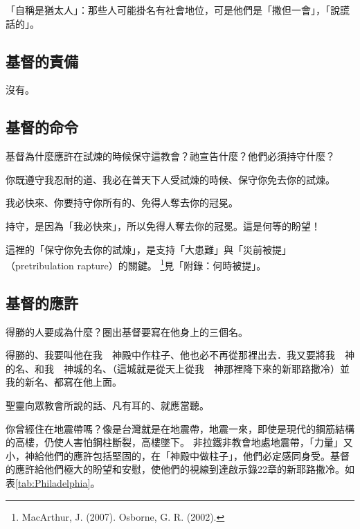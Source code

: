 「自稱是猶太人」：那些人可能掛名有社會地位，可是他們是「撒但一會」，「說謊話的」。
 
\subsection{基督的責備}

沒有。

\subsection{基督的命令}

\begin{ScriptureBox2}{基督為什麼應許在試煉的時候保守這教會？祂宣告什麼？他們必須持守什麼？}

\item[3:10] 你既遵守我忍耐的道、我必在普天下人受試煉的時候、保守你免去你的試煉。

\item[3:11] 我必快來、你要持守你所有的、免得人奪去你的冠冕。

\end{ScriptureBox2}

持守，是因為「我必快來」，所以免得人奪去你的冠冕。這是何等的盼望！

這裡的「保守你免去你的試煉」，是支持「大患難」與「災前被提」（pretribulation rapture）的關鍵。
\footnote{MacArthur, J. (2007). Osborne, G. R. (2002).}見「附錄：何時被提」。

\subsection{基督的應許}

\begin{ScriptureBox2}{得勝的人要成為什麼？圈出基督要寫在他身上的三個名。}

\item[3:12] 得勝的、我要叫他在我　神殿中作柱子、他也必不再從那裡出去．我又要將我　神的名、和我　神城的名、（這城就是從天上從我　神那裡降下來的新耶路撒冷）並我的新名、都寫在他上面。

\item[3:13] 聖靈向眾教會所說的話、凡有耳的、就應當聽。

\end{ScriptureBox2}

你曾經住在地震帶嗎？像是台灣就是在地震帶，地震一來，即使是現代的鋼筋結構的高樓，仍使人害怕鋼柱斷裂，高樓墜下。
非拉鐵非教會地處地震帶，「力量」又小，神給他們的應許包括堅固的，在「神殿中做柱子」，他們必定感同身受。基督的應許給他們極大的盼望和安慰，使他們的視線到達啟示錄22章的新耶路撒冷。如表\ref{tab:Philadelphia}。

